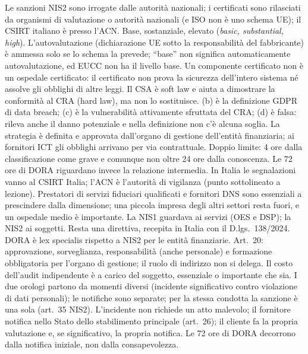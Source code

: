 \begin{description}[leftmargin=2.5em,labelwidth=2em,font=\normalfont\bfseries]
   Le sanzioni NIS2 sono irrogate dalle autorità nazionali; i certificati sono
    rilasciati da organismi di valutazione o autorità nazionali (e ISO non è uno schema UE); il CSIRT
    italiano è presso l'ACN.
   Base, sostanziale, elevato (\emph{basic, substantial, high}).
   L'autovalutazione (dichiarazione UE sotto la responsabilità del fabbricante) è
    ammessa solo se lo schema la prevede; ``base'' non significa automaticamente autovalutazione, ed
    EUCC non ha il livello base.
   Un componente certificato non è un ospedale certificato: il certificato non prova
    la sicurezza dell'intero sistema né assolve gli obblighi di altre leggi.
   Il CSA è soft law e aiuta a dimostrare la conformità al CRA (hard law), ma non lo
    sostituisce.
   (b) è la definizione GDPR di data breach; (c) è la vulnerabilità
    attivamente sfruttata del CRA; (d) è falsa: rileva anche il danno potenziale e nella definizione non
    c'è alcuna soglia.
   La strategia è definita e approvata dall'organo di gestione dell'entità
    finanziaria; ai fornitori ICT gli obblighi arrivano per via contrattuale.
   Doppio limite: 4 ore dalla classificazione come grave e comunque non oltre
    24 ore dalla conoscenza. Le 72 ore di DORA riguardano invece la relazione intermedia.
   In Italia le segnalazioni vanno al CSIRT Italia; l'ACN è l'autorità di
    vigilanza (punto sottolineato a lezione).
   Prestatori di servizi fiduciari qualificati e fornitori DNS sono essenziali a
    prescindere dalla dimensione; una piccola impresa degli altri settori resta fuori, e un ospedale medio
    è importante.
   La NIS1 guardava ai servizi (OES e DSP); la NIS2 ai soggetti. Resta una
    direttiva, recepita in Italia con il D.lgs.~138/2024.
   DORA è lex specialis rispetto a NIS2 per le entità finanziarie.
   Art.~20: approvazione, sorveglianza, responsabilità (anche personale) e
    formazione obbligatoria per l'organo di gestione; il ruolo di indirizzo non si delega.
   Il costo dell'audit indipendente è a carico del soggetto, essenziale o
    importante che sia.
   I due orologi partono da momenti diversi (incidente significativo contro
    violazione di dati personali); le notifiche sono separate; per la stessa condotta la sanzione è una
    sola (art.~35 NIS2).
   L'incidente non richiede un atto malevolo; il fornitore notifica nello Stato
    dello stabilimento principale (art.~26); il cliente fa la propria valutazione e, se significativo,
    la propria notifica.
   Le 72 ore di DORA decorrono dalla notifica iniziale, non dalla consapevolezza.
\end{description}
